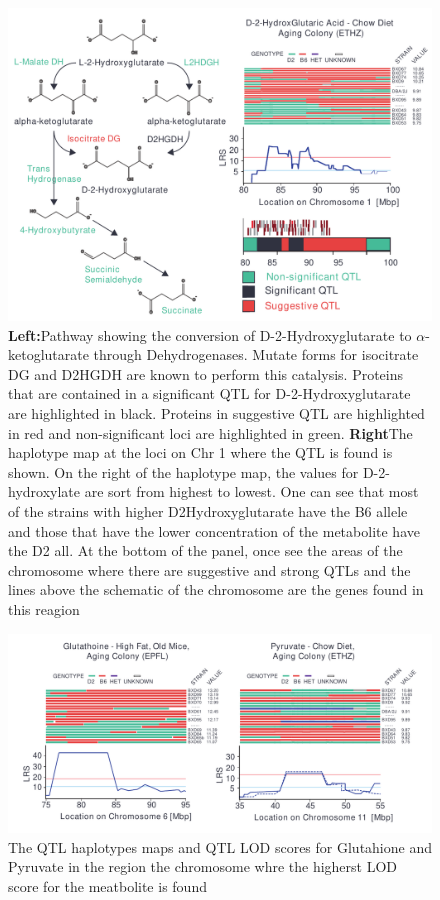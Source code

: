 \documentclass[a4paper,11pt,twoside]{book}
\begin{document}
    \begin{figure}
	\includegraphics[width=1.2\linewidth]{QTL_Results/D2HG_QTL.pdf}
	\caption{\textbf{Left:}Pathway showing the conversion of D-2-Hydroxyglutarate to $\alpha$-ketoglutarate through Dehydrogenases. Mutate forms for isocitrate DG and D2HGDH are known to perform this catalysis. Proteins that are contained in a significant QTL for D-2-Hydroxyglutarate are highlighted in black. Proteins in suggestive QTL are highlighted in red and non-significant loci are highlighted in green. \textbf{Right}The haplotype map at the loci on Chr 1 where the QTL is found is shown. On the right of the haplotype map, the values for D-2-hydroxylate are sort from highest to lowest. One can see that most of the strains with higher D2Hydroxyglutarate have the B6 allele and those that have the lower concentration of the metabolite have the D2 all. At the bottom of the panel, once see the areas of the chromosome where there are suggestive and strong QTLs and the lines above the schematic of the chromosome are the genes found in this reagion}
	\end{figure}
	
	\begin{figure}[ht!]
		\centering
		\includegraphics[width=1.2\linewidth]{3.Metabolomics/QTL_Results}
		\caption{ The QTL haplotypes maps and QTL LOD scores for Glutahione and Pyruvate in the region the chromosome whre the higherst LOD score for the meatbolite is found}
		\label{fig:qtlresults}
	\end{figure}
	
\end{document}
